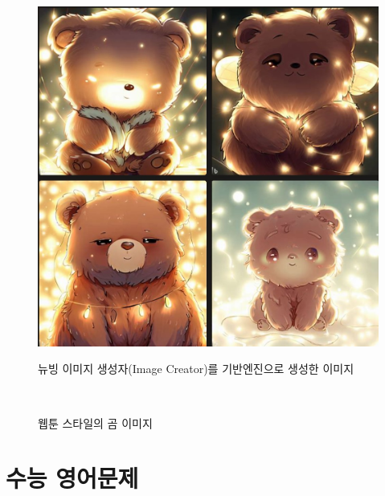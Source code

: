\documentclass[
  letterpaper,
]{book}
\begin{document}
\begin{figure}
\begin{minipage}[t]{0.49\linewidth}
{{\includegraphics{images/image_prompt_bear.jpg}

}

\caption{웹툰 스타일의 곰 이미지}

}

\end{minipage}%
\newline
\begin{minipage}[t]{0.49\linewidth}

{\centering 

뉴빙 이미지 생성자(Image Creator)를 기반엔진으로 생성한 이미지

}

\end{minipage}%
%
\begin{minipage}[t]{0.02\linewidth}

{\centering 

~

}

\end{minipage}%

\end{figure}

\hypertarget{uxc218uxb2a5-uxc601uxc5b4uxbb38uxc81c}{%
\section{수능 영어문제}\label{uxc218uxb2a5-uxc601uxc5b4uxbb38uxc81c}}
\end{document}
